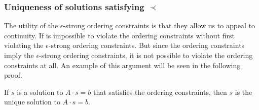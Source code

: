 \documentclass{patmorin}
\begin{document}
\subsubsection{Uniqueness of solutions satisfying $\prec$}

The utility of the $\epsilon$-strong ordering constraints is that they
allow us to appeal to continuity. If is impossible 
to violate
the ordering constraints without first violating the
 $\epsilon$-strong ordering constraints.
But since the ordering constraints imply the
 $\epsilon$-strong ordering constraints,
it is not possible
to violate
the ordering constraints at all.
An example of this argument will be seen in the following proof.

\begin{lem}
   If $s$ is a solution to $A\cdot s=b$ that satisfies the ordering
   constraints, %
then $s$ is 
   the unique solution to $A\cdot s=b$.
\end{lem}
\end{document}
